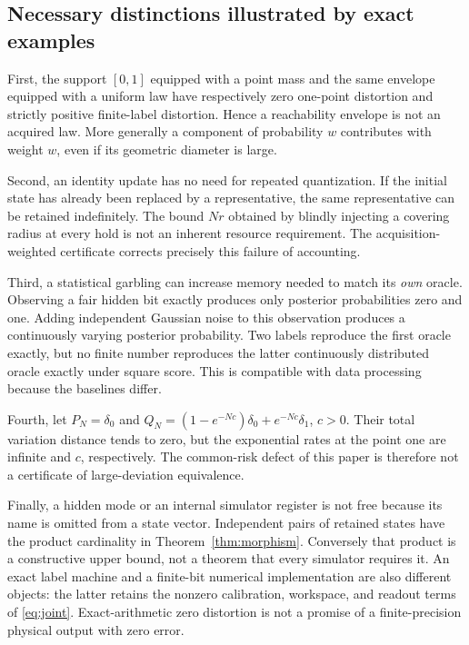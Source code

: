 \subsection{Necessary distinctions illustrated by exact examples}
First, the support $[0,1]$ equipped with a point mass and the same envelope equipped with a uniform law have respectively zero one-point distortion and strictly positive finite-label distortion. Hence a reachability envelope is not an acquired law. More generally a component of probability $w$ contributes with weight $w$, even if its geometric diameter is large.

Second, an identity update has no need for repeated quantization. If the initial state has already been replaced by a representative, the same representative can be retained indefinitely. The bound $Nr$ obtained by blindly injecting a covering radius at every hold is not an inherent resource requirement. The acquisition-weighted certificate corrects precisely this failure of accounting.

Third, a statistical garbling can increase memory needed to match its \emph{own} oracle. Observing a fair hidden bit exactly produces only posterior probabilities zero and one. Adding independent Gaussian noise to this observation produces a continuously varying posterior probability. Two labels reproduce the first oracle exactly, but no finite number reproduces the latter continuously distributed oracle exactly under square score. This is compatible with data processing because the baselines differ.

Fourth, let $P_N=\delta_0$ and $Q_N=(1-e^{-Nc})\delta_0+e^{-Nc}\delta_1$, $c>0$. Their total variation distance tends to zero, but the exponential rates at the point one are infinite and $c$, respectively. The common-risk defect of this paper is therefore not a certificate of large-deviation equivalence.

Finally, a hidden mode or an internal simulator register is not free because its name is omitted from a state vector. Independent pairs of retained states have the product cardinality in Theorem~\ref{thm:morphism}. Conversely that product is a constructive upper bound, not a theorem that every simulator requires it. An exact label machine and a finite-bit numerical implementation are also different objects: the latter retains the nonzero calibration, workspace, and readout terms of \eqref{eq:joint}. Exact-arithmetic zero distortion is not a promise of a finite-precision physical output with zero error.


